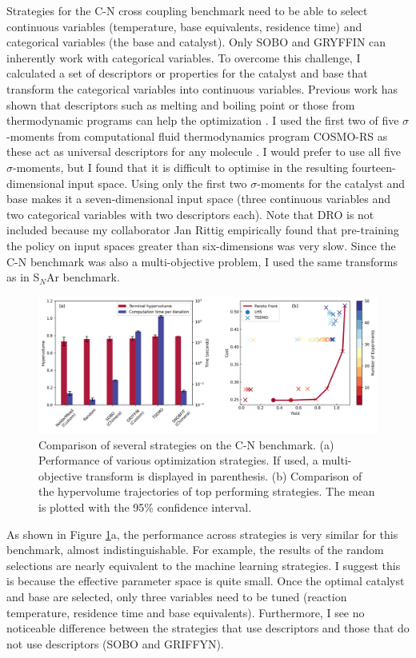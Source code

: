 Strategies for the C-N cross coupling benchmark need to be able to select continuous variables (temperature, base equivalents, residence time) and categorical variables (the base and catalyst). Only SOBO and GRYFFIN can inherently work with categorical variables. To overcome this challenge, I calculated a set of descriptors or properties for the catalyst and base that transform the categorical variables into continuous variables. Previous work has shown that descriptors such as melting and boiling point or those from thermodynamic programs can help the optimization \cite{Amar2019, Hase2020a}. I used the first two of five $\sigma$-moments from computational fluid thermodynamics program COSMO-RS as these act as universal descriptors for any molecule \cite{Zissimos2002}. I would prefer to use all five $\sigma$-moments, but I found that it is difficult to optimise in the resulting fourteen-dimensional input space. Using only the first two $\sigma$-moments for the catalyst and base makes it a seven-dimensional input space (three continuous variables and two categorical variables with two descriptors each).  Note that DRO is not included because my collaborator Jan Rittig empirically found that pre-training the policy on input spaces greater than six-dimensions was very slow. Since the C-N benchmark was also a multi-objective problem, I used the same transforms as in S$_N$Ar benchmark.

\begin{figure}
    \centering
    \includegraphics[width=1.2\textwidth]{gfx/Chapter03/cn_hv_time_tradeoff.png}
    \caption{Comparison of several strategies on the C-N benchmark. (a) Performance of various optimization strategies. If used, a multi-objective transform is displayed in parenthesis. (b) Comparison of the hypervolume trajectories of top performing strategies. The mean is plotted with the 95\% confidence interval.}
    \label{fig:cn_hv_time}
\end{figure}

As shown in Figure \ref{fig:cn_hv_time}a, the performance across strategies is very similar for this benchmark, almost indistinguishable. For example, the results of the random selections are nearly equivalent to the machine learning strategies. I suggest this is because the effective parameter space is quite small. Once the optimal catalyst and base are selected, only three variables need to be tuned (reaction temperature, residence time and base equivalents). Furthermore, I see no noticeable difference between the strategies that use descriptors and those that do not use descriptors (SOBO and GRIFFYN).

